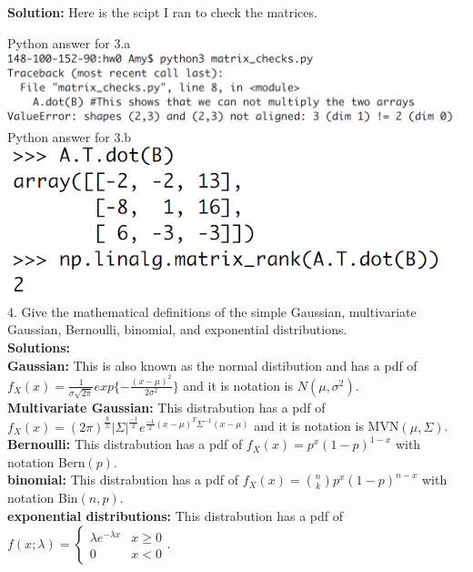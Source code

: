 \documentclass[a4paper]{article}
\begin{document}
\indent \textbf{Solution:}
Here is the scipt I ran to check the matrices. 

Python answer for 3.a \\
\includegraphics[width=1\textwidth]{matrix_errors} 
\smallskip \\
Python answer for 3.b \\
\includegraphics[width=.6\textwidth]{matrix_answers}
\\
4. Give the mathematical definitions of the simple Gaussian,
multivariate Gaussian, Bernoulli, binomial, and exponential distributions.
\\
\indent \textbf{Solutions:}
\smallskip
\\
\indent \textbf{Gaussian:} This is also known as the normal distibution
and has a pdf of $f_X(x) = \frac{1}{\sigma \sqrt{2\pi}}exp\{- \frac{(x-\mu)^2}{2\sigma^2} \}$
and it is notation is $N(\mu,\sigma^2)$.
\smallskip
\\
\indent \textbf{Multivariate Gaussian:} This distrabution has
a pdf of $f_X(x)=(2\pi)^\frac{k}{\Sigma} |\Sigma|^{\frac{-1}{2}} e^{\frac{-1}{2}(x-\mu)^T\Sigma^{-1}(x-\mu)}$
and it is notation is MVN$(\mu,\Sigma)$.
\smallskip
\\
\indent \textbf{Bernoulli:} This distrabution has a pdf of
$f_X(x) = p^x(1-p)^{1-x}$ with notation Bern$(p)$.
\smallskip
\\
\indent \textbf{binomial:} This distrabution has a pdf of
$f_X(x)= \binom{n}{k} p^x(1-p)^{n-x}$ with notation Bin$(n,p)$.
\smallskip
\\
\indent \textbf{exponential distributions:} This distrabution has a pdf of
$f(x;\lambda)= \begin{cases} \lambda e^{-\lambda x} & x\geq0 \\ 0 & x<0 \end{cases}$.
\bigskip
\\
\end{document}
